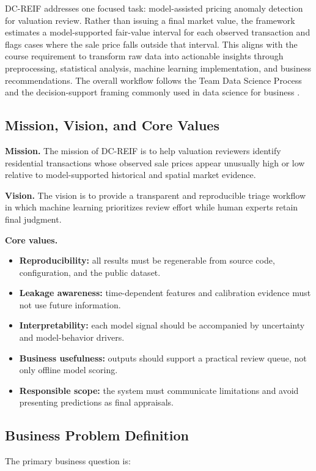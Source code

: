 \documentclass[12pt,a4paper]{article}
\begin{document}
DC-REIF addresses one focused task: model-assisted pricing anomaly detection for valuation review. Rather than issuing a final market value, the framework estimates a model-supported fair-value interval for each observed transaction and flags cases where the sale price falls outside that interval. This aligns with the course requirement to transform raw data into actionable insights through preprocessing, statistical analysis, machine learning implementation, and business recommendations. The overall workflow follows the Team Data Science Process and the decision-support framing commonly used in data science for business \citep{microsofttdsp, provost2013data}.

\subsection{Mission, Vision, and Core Values}
\textbf{Mission.} The mission of DC-REIF is to help valuation reviewers identify residential transactions whose observed sale prices appear unusually high or low relative to model-supported historical and spatial market evidence.

\textbf{Vision.} The vision is to provide a transparent and reproducible triage workflow in which machine learning prioritizes review effort while human experts retain final judgment.

\textbf{Core values.}
\begin{itemize}
    \item \textbf{Reproducibility:} all results must be regenerable from source code, configuration, and the public dataset.
    \item \textbf{Leakage awareness:} time-dependent features and calibration evidence must not use future information.
    \item \textbf{Interpretability:} each model signal should be accompanied by uncertainty and model-behavior drivers.
    \item \textbf{Business usefulness:} outputs should support a practical review queue, not only offline model scoring.
    \item \textbf{Responsible scope:} the system must communicate limitations and avoid presenting predictions as final appraisals.
\end{itemize}

\subsection{Business Problem Definition}
The primary business question is:
\end{document}
